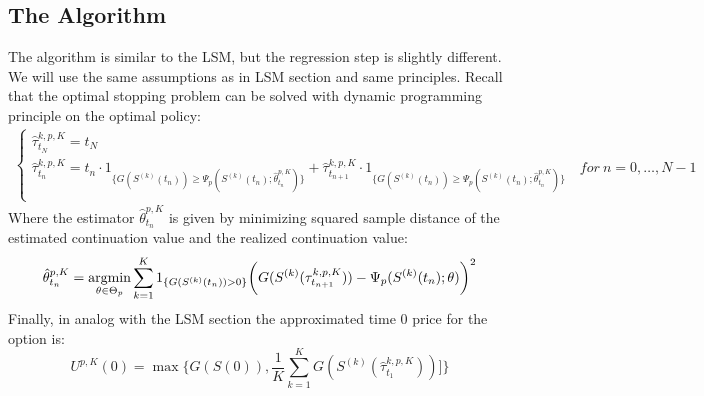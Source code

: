 \subsection{The Algorithm}
The algorithm is similar to the LSM, but the regression step is slightly different. We will use the same assumptions as in LSM section and same principles. Recall that the optimal stopping problem can be solved with dynamic programming principle on the optimal policy:
\begin{equation*}\label{LSMDynamic3}
\begin{split}
\begin{cases}
          \hat{\tau}_{t_N}^{k,p,K} = t_N\\
          \hat{\tau}_{t_n}^{k,p,K} = t_n \cdot 1_{\{G(S^{(k)}(t_n)) \geq \Psi_p(S^{(k)}(t_n) ; \hat{\theta}_{t_n}^{p,K} ) \}} + \hat{\tau}_{t_{n+1}}^{k,p,K} \cdot 1_{\{G(S^{(k)}(t_n)) \geq \Psi_p(S^{(k)}(t_n) ; \hat{\theta}_{t_n}^{p,K} ) \}} \quad for \ n={0,\ldots,N-1} \\ 
\end{cases}
\end{split}
\end{equation*}
Where the estimator $\hat{\theta}_{t_n}^{p,K}$ is given by minimizing squared sample distance of the estimated continuation value and the realized continuation value:
\begin{align*}
\hat{\theta}_{t_n}^{p,K}= \operatorname*{argmin}_{\theta \in \Theta_p} \sum_{k=1}^{K} 1_{\{G(S^{(k)}(t_n))>0\}} \bigg(G(S^{(k)}(\tau^{k,p,K}_{t_{n+1}}))  - \Psi_p(S^{(k)}(t_n) ; \theta ) \bigg)^2
\end{align*}
Finally, in analog with the LSM section the approximated time 0 price for the option is:
\begin{equation*}
U^{p,K}(0) = \max \{ G(S(0)), \frac{1}{K} \sum_{k=1}^{K} G(S^{(k)}(\hat{\tau}^{k,p,K}_{t_1}))]\}
\end{equation*}


\newpage


